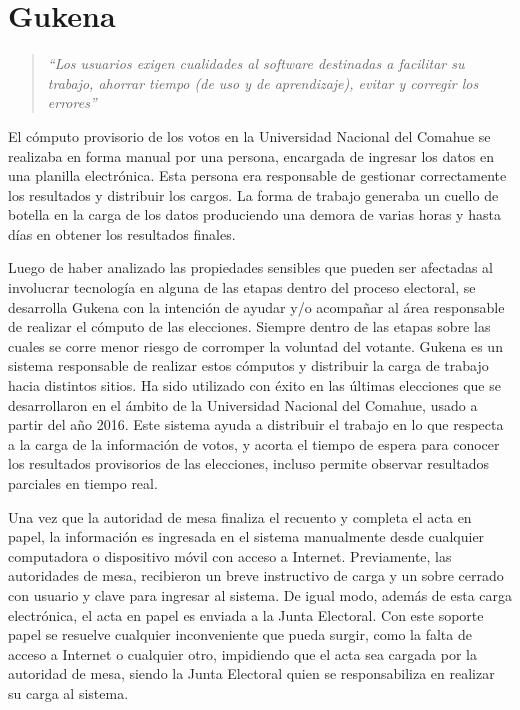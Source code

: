 \chapter{Gukena}
\label{Gukena}

\begin{quote}\textit{``Los usuarios exigen cualidades al software destinadas a facilitar su trabajo, ahorrar tiempo (de uso y de aprendizaje), evitar y corregir los errores''} \cite{definicionUsuarioInterfaz}\end{quote} 
El cómputo provisorio de los votos en la Universidad Nacional del Comahue se realizaba en forma manual por una persona, encargada de ingresar los datos en una planilla electrónica. Esta persona era responsable de gestionar correctamente los resultados y distribuir los cargos. La forma de trabajo generaba un cuello de botella en la carga de los datos produciendo una demora de varias horas y hasta días en obtener los resultados finales.

Luego de haber analizado las propiedades sensibles que pueden ser afectadas al involucrar tecnología en alguna de las etapas dentro del proceso electoral, se desarrolla Gukena con la intención de ayudar y/o 
acompañar al área responsable de realizar el cómputo de las elecciones. Siempre dentro de las etapas sobre las cuales se corre menor riesgo de corromper la voluntad del votante. Gukena es un sistema responsable de realizar estos cómputos y distribuir la carga de trabajo hacia distintos sitios. Ha sido utilizado con éxito en las últimas elecciones que se desarrollaron en el ámbito de la Universidad Nacional del Comahue, usado a partir del año 2016. Este sistema ayuda a distribuir el trabajo en lo que respecta a la carga de la información de votos, y acorta el tiempo de espera para conocer los resultados provisorios de las elecciones, incluso permite observar resultados parciales en tiempo real.\newline

Una vez que la autoridad de mesa finaliza el recuento y completa el acta en papel,  la información es ingresada en el sistema manualmente desde cualquier computadora o dispositivo móvil con acceso a Internet. Previamente, las autoridades de mesa, recibieron un breve instructivo de carga y un sobre cerrado con usuario y clave para ingresar al sistema. De igual modo, además de esta carga electrónica, el acta en papel es enviada a la Junta Electoral. Con este soporte papel se resuelve cualquier inconveniente que pueda surgir, como la falta de acceso a Internet o cualquier otro,  impidiendo que el acta sea cargada por la autoridad de mesa, siendo la Junta Electoral quien se responsabiliza en realizar su carga al sistema.

